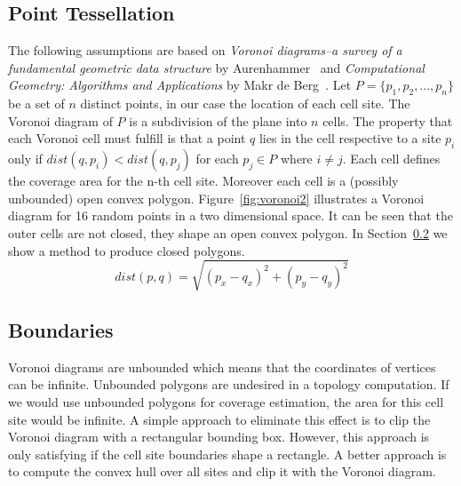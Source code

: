 \documentclass[master,english]{hgbthesis}
\begin{document}
\subsection{Point Tessellation}
The following assumptions are based on \emph{Voronoi diagrams--a survey of a fundamental geometric data structure} by Aurenhammer~\cite{Aurenhammer1991} and \emph{Computational Geometry: Algorithms and Applications} by Makr de Berg~\cite{Berg2000}.
Let $P=\{p_1,p_2,...,p_n\}$ be a set of $n$ distinct points, in our case the location of each cell site. The Voronoi diagram of $P$ is a subdivision of the plane into $n$ cells. The property that each Voronoi cell must fulfill is that a point $q$ lies in the cell respective to a site $p_i$ only if $dist\left(q,p_i\right) < dist\left(q,p_j\right)$ for each $p_j \in P$ where $i \neq j$. Each cell defines the coverage area for the n-th cell site. Moreover each cell is a (possibly unbounded) open convex polygon. Figure~\ref{fig:voronoi2} illustrates a Voronoi diagram for 16 random points in a two dimensional space. It can be seen that the outer cells are not closed, they shape an open convex polygon. In Section~\ref{sec:boundaries} we show a method to produce closed polygons.
\begin{equation}
	dist(p,q)=\sqrt{\left(p_x-q_x\right)^2+\left(p_y-q_y\right)^2}
\end{equation}
\subsection{Boundaries}
\label{sec:boundaries}
Voronoi diagrams are unbounded which means that the coordinates of vertices can be infinite. Unbounded polygons are undesired in a topology computation. If we would use unbounded polygons for coverage estimation, the area for this cell site would be infinite. A simple approach to eliminate this effect is to clip the Voronoi diagram with a rectangular bounding box. However, this approach is only satisfying if the cell site boundaries shape a rectangle. A better approach is to compute the convex hull over all sites and clip it with the Voronoi diagram.
\end{document}
